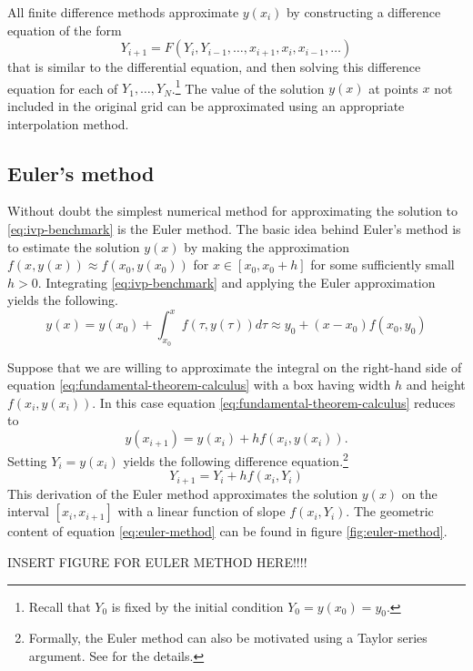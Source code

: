 \documentclass[11pt]{article}
\begin{document}
All finite difference methods approximate $y(x_i)$ by constructing a difference equation of the form
\begin{equation}
	Y_{i+1} = F(Y_i, Y_{i-1},\dots,x_{i+1},x_i,x_{i-1},\dots)
\end{equation}   
that is  similar to the differential equation, and then solving this difference equation for each of $Y_1,\dots, Y_N$.\footnote{Recall that $Y_0$ is fixed by the initial condition $Y_0=y(x_0) = y_0$.} The value of the solution $y(x)$ at points $x$ not included in the original grid can be approximated using an appropriate interpolation method.

\subsection{Euler's method}
Without doubt the simplest numerical method for approximating the solution to \ref{eq:ivp-benchmark} is the Euler method. The basic idea behind Euler's method is to estimate the solution $y(x)$ by making the approximation $f(x, y(x)) \approx f(x_0, y(x_0))$ for $x \in [x_0, x_0 + h]$ for some sufficiently small $h > 0$. Integrating \ref{eq:ivp-benchmark} and applying the Euler approximation yields the following.
\begin{equation}
	y(x) = y(x_0) + \int_{x_0}^{x} f(\tau, y(\tau))d\tau \approx y_0 + (x - x_0)f(x_0, y_0)
\end{equation} 

Suppose that we are willing to approximate the integral on the right-hand side of equation \ref{eq:fundamental-theorem-calculus} with a box having width $h$ and height $f(x_i, y(x_i))$. In this case equation \ref{eq:fundamental-theorem-calculus} reduces to
\begin{equation}
	y(x_{i+1}) = y(x_i) + hf(x_i, y(x_i)).
\end{equation}
Setting $Y_i = y(x_i)$ yields the following difference equation.\footnote{Formally, the Euler method can also be motivated using a Taylor series argument. See \cite{judd1998numerical} for the details.}
\begin{equation}\label{eq:euler-method}
	Y_{i+1} = Y_i + hf(x_i, Y_i)
\end{equation}
This derivation of the Euler method approximates the solution $y(x)$ on the interval $[x_i, x_{i+1}]$ with a linear function of slope $f(x_i, Y_i)$. The geometric content of equation \ref{eq:euler-method} can be found in figure \ref{fig:euler-method}. 

INSERT FIGURE FOR EULER METHOD HERE!!!!
\end{document}

